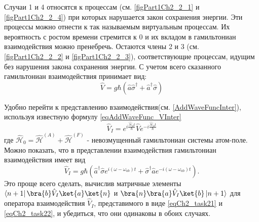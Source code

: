 Случаи 1 и 4 относятся к процессам (см. \autoref{figPart1Ch2_2_1} и
\ref{figPart1Ch2_2_4}) при которых нарушается закон сохранения энергии.
Эти процессы можно отнести к так называемым виртуальным процессам. Их
вероятность с ростом времени стремится к 0 и
их вкладом в гамильтониан взаимодействия можно
пренебречь. Остаются члены 2 и 3 (см. \autoref{figPart1Ch2_2_2} и
\ref{figPart1Ch2_2_3}), соответствующие процессам,
идущим без нарушения закона сохранения энергии. С учетом всего
сказанного гамильтониан взаимодействия принимает вид: 
\begin{equation}
\hat{V} = g \hbar \left(
\hat{a}\hat{\sigma}^{\dag} + 
\hat{a}^{\dag}\hat{\sigma}
\right)
\end{equation}

Удобно перейти к представлению взаимодействия(см. \autoref{AddWaveFuncInter}),
используя известную 
формулу \eqref{eqAddWaveFunc_VInter}
\begin{equation}
\hat{V}_I = 
e^{i \frac{\hat{\mathcal{H}}_0 t}{\hbar}}
\hat{V}
e^{- i \frac{\hat{\mathcal{H}}_0 t}{\hbar}}
\label{eqCh2_task21}
\end{equation}
где 
\(
\hat{\mathcal{H}}_0 = 
\hat{\mathcal{H}}^{\left(A\right)} +
\hat{\mathcal{H}}^{\left(F\right)}
\)
- невозмущенный гамильтониан системы атом-поле. Можно показать, что в
представлении взаимодействия гамильтониан взаимодействия имеет вид 
\begin{equation}
\hat{V}_I = 
g \hbar \left(
\hat{a}^{\dag}\hat{\sigma} e^{i \left(\omega - \omega_{ab}\right)t} +
\hat{\sigma}^{\dag} \hat{a} e^{-i \left(\omega - \omega_{ab}\right)t}
\right).
\label{eqCh2_task22}
\end{equation}
Это проще всего сделать, вычислив матричные элементы 
$\left<n +
1\right|\bra{b}\hat{V}_I\ket{a}\ket{n}$ и
$\bra{n}\bra{a}\hat{V}_I\ket{b}\left|n +
1\right>$ для оператора взаимодействия $\hat{V}_I$, представимого в
виде \eqref{eqCh2_task21} и \eqref{eqCh2_task22}, и убедиться, что они
одинаковы в обоих случаях.
